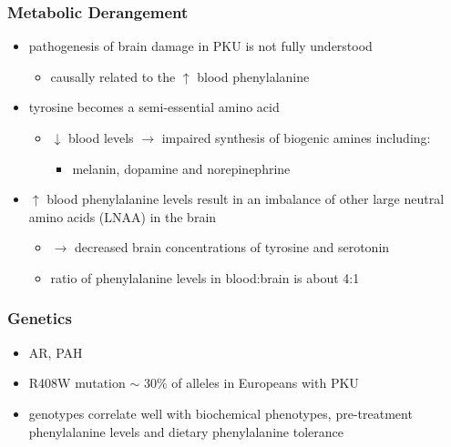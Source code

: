 \documentclass{scrartcl}
\begin{document}
\subsubsection{Metabolic Derangement}
\label{sec:org7f004e1}
\begin{itemize}
\item pathogenesis of brain damage in PKU is not fully understood
\begin{itemize}
\item causally related to the \(\uparrow\) blood phenylalanine
\end{itemize}
\item tyrosine becomes a semi-essential amino acid
\begin{itemize}
\item \(\downarrow\) blood levels \(\to\) impaired synthesis of biogenic amines including:
\begin{itemize}
\item melanin, dopamine and norepinephrine
\end{itemize}
\end{itemize}
\item \(\uparrow\) blood phenylalanine levels result in an imbalance of other large
neutral amino acids (LNAA) in the brain
\begin{itemize}
\item \(\to\) decreased brain concentrations of tyrosine and serotonin
\item ratio of phenylalanine levels in blood:brain is about 4:1
\end{itemize}
\end{itemize}

\subsubsection{Genetics}
\label{sec:orgd66bc0a}
\begin{itemize}
\item AR, PAH
\item R408W mutation \(\sim\) 30\% of alleles in Europeans with PKU
\item genotypes correlate well with biochemical phenotypes, pre-treatment
phenylalanine levels and dietary phenylalanine tolerance
\end{itemize}
\end{document}
